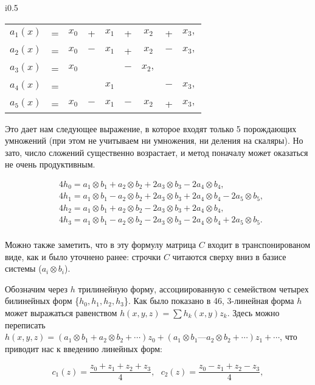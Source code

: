 \documentclass{mai_book}
\begin{document}
\begin{wraptable}{i}{0.5\textwidth}
  \begin{tabular}{ccccccccc}
    $a_1(x)$ & = & $x_0$ & + & $x_1$ & + & $x_2$ & + & $x_3,$ \\
    $a_2(x)$ & = & $x_0$ & $-$ & $x_1$ & + & $x_2$ & $-$ & $x_3,$ \\
   $a_3(x)$ & = & $x_0$ &  &  & $-$ & $x_2,$ &  & \\
    $a_4(x)$ & = &  &  & $x_1$ & & & $-$ & $x_3,$ \\
    $a_5(x)$ & = & $x_0$ & $-$ & $x_1$ & $-$ & $x_2$ & + & $x_3,$ \\
    \end{tabular}
  \end{wraptable}
Это дает нам следующее выражение, в которое входят только 5 порождающих умножений (при этом не учитываем ни умножения, ни деления на скаляры). Но зато, число сложений существенно возрастает, и метод поначалу может оказаться не очень продуктивным.
\begin{center}
  \begin{equation} \label{n10}
    \begin{split}
&4h_0=a_1 \otimes b_1 + a_2 \otimes b_2 + 2a_3 \otimes b_3 - 2a_4 \otimes b_4, \\
&4h_1 = a_1 \otimes b_1 - a_2 \otimes b_2 + 2a_3 \otimes b_3 + 2a_4 \otimes b_4 - 2a_5 \otimes b_5, \\
&4h_2 = a_1 \otimes b_1 + a_2 \otimes b_2 - 2a_3 \otimes b_3 + 2a_4 \otimes b_4, \\
&4h_3 = a_1 \otimes b_1 - a_2 \otimes b_2 - 2a_3 \otimes b_3 - 2a_4 \otimes b_4 + 2a_5 \otimes b_5. \\
    \end{split}
  \end{equation}
  \end{center}Можно также заметить, что в эту формулу матрица $C$ входит в транспонированом виде, как и было уточнено ранее: строчки $C$ читаются сверху вниз в базисе системы ($a_i \otimes b_i$).\par
Обозначим через $h$ трилинейную форму, ассоциированную с семейством четырех билинейных форм \{$h_0,h_1,h_2,h_3$\}. Как было показано в 46, 3-линейная форма $h$ может выражаться равенством $h(x,y,z) = \sum h_k(x,y)z_k$. Здесь можно переписать $h(x,y,z) = (a_1 \otimes b_1 + a_2 \otimes b_2 + \cdots)z_0 + (a_1 \otimes b_1 — a_2 \otimes b_2 + \cdots)z_1 + \cdots$, что приводит нас к введению линейных форм:\par
$$c_1(z)= \frac{z_0+z_1+z_2+z_3}{4},\ \ \ c_2(z)= \frac{z_0-z_1+z_2-z_3}{4},$$
\end{document}
